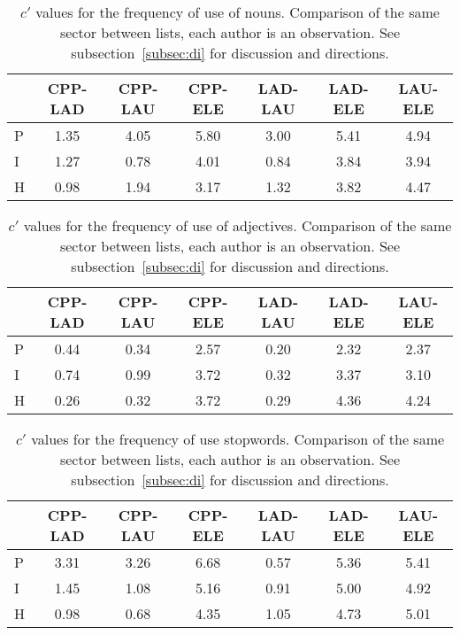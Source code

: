 \begin{table}
  \centering
  \caption{$c'$ values for the frequency of use of nouns. Comparison of the same sector between lists, each author is an observation. See subsection~\ref{subsec:di} for discussion and directions.}
    \small
  \begin{tabular}{l| c c c c c c}
& CPP-LAD & CPP-LAU & CPP-ELE & LAD-LAU & LAD-ELE & LAU-ELE \\\hline
P & 1.35 & 4.05 & 5.80 & 3.00 & 5.41 & 4.94 \\
I & 1.27 & 0.78 & 4.01 & 0.84 & 3.84 & 3.94 \\
H & 0.98 & 1.94 & 3.17 & 1.32 & 3.82 & 4.47 \\
  \end{tabular}
  \label{tab:kolSubInter}
\end{table}

\begin{table}
  \centering
  \caption{$c'$ values for the frequency of use of adjectives. Comparison of the same sector between lists, each author is an observation. See subsection~\ref{subsec:di} for discussion and directions.}
    \small
  \begin{tabular}{l| c c c c c c}
 & CPP-LAD & CPP-LAU & CPP-ELE & LAD-LAU & LAD-ELE & LAU-ELE \\\hline
P & 0.44 & 0.34 & 2.57 & 0.20 & 2.32 & 2.37 \\
I & 0.74 & 0.99 & 3.72 & 0.32 & 3.37 & 3.10 \\
H & 0.26 & 0.32 & 3.72 & 0.29 & 4.36 & 4.24 \\
  \end{tabular}
  \label{tab:kolAdjInter}
\end{table}

\begin{table}
  \centering
  \caption{$c'$ values for the frequency of use stopwords. Comparison of the same sector between lists, each author is an observation. See subsection~\ref{subsec:di} for discussion and directions.}
    \small
  \begin{tabular}{l| c c c c c c}
 & CPP-LAD & CPP-LAU & CPP-ELE & LAD-LAU & LAD-ELE & LAU-ELE \\\hline
P & 3.31 & 3.26 & 6.68 & 0.57 & 5.36 & 5.41 \\
I & 1.45 & 1.08 & 5.16 & 0.91 & 5.00 & 4.92 \\
H & 0.98 & 0.68 & 4.35 & 1.05 & 4.73 & 5.01 \\
  \end{tabular}
  \label{tab:kolSwInter}
\end{table}


